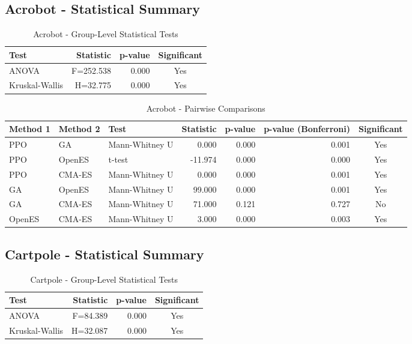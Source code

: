 \documentclass[12pt]{article}
\begin{document}
\subsection{Acrobot - Statistical Summary}

\begin{table}[h!]
\centering
\caption{Acrobot - Group-Level Statistical Tests}
\begin{tabular}{|l|r|r|c|}
\hline
\textbf{Test} & \textbf{Statistic} & \textbf{p-value} & \textbf{Significant} \\
\hline\hline
ANOVA & F=252.538 & 0.000 & Yes \\
Kruskal-Wallis & H=32.775 & 0.000 & Yes \\
\hline
\end{tabular}
\end{table}

\begin{table}[h!]
\centering
\caption{Acrobot - Pairwise Comparisons}
\begin{tabular}{|l|l|l|r|r|r|c|}
\hline
\textbf{Method 1} & \textbf{Method 2} & \textbf{Test} & \textbf{Statistic} & \textbf{p-value} & \textbf{p-value (Bonferroni)} & \textbf{Significant} \\
\hline\hline
PPO & GA & Mann-Whitney U & 0.000 & 0.000 & 0.001 & Yes \\
PPO & OpenES & t-test & -11.974 & 0.000 & 0.000 & Yes \\
PPO & CMA-ES & Mann-Whitney U & 0.000 & 0.000 & 0.001 & Yes \\
GA & OpenES & Mann-Whitney U & 99.000 & 0.000 & 0.001 & Yes \\
GA & CMA-ES & Mann-Whitney U & 71.000 & 0.121 & 0.727 & No \\
OpenES & CMA-ES & Mann-Whitney U & 3.000 & 0.000 & 0.003 & Yes \\
\hline
\end{tabular}
\end{table}

\subsection{Cartpole - Statistical Summary}

\begin{table}[h!]
\centering
\caption{Cartpole - Group-Level Statistical Tests}
\begin{tabular}{|l|r|r|c|}
\hline
\textbf{Test} & \textbf{Statistic} & \textbf{p-value} & \textbf{Significant} \\
\hline\hline
ANOVA & F=84.389 & 0.000 & Yes \\
Kruskal-Wallis & H=32.087 & 0.000 & Yes \\
\hline
\end{tabular}
\end{table}
\end{document}
